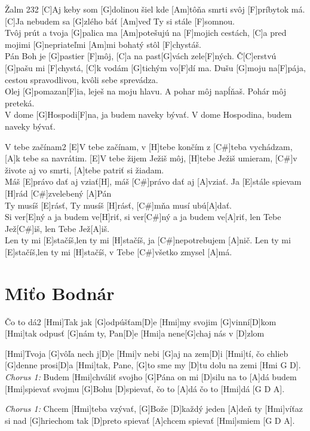 \documentclass[12pt]{article}
\begin{document}
\begin{song}{Žalm 23}{2}
	[C]Aj keby som [G]dolinou šiel 
	kde [Am]tôňa smrti svôj [F]príbytok má.
	[C]Ja nebudem sa [G]zlého báť 
	[Am]veď Ty si stále [F]somnou.
	\\
	[C]Tvôj prút a tvoja [G]palica ma 
	[Am]potešujú na [F]mojich cestách,
	[C]a pred mojimi [G]nepriateľmi 
	[Am]mi bohatý stôl [F]chystáš.
	\\
	[C]Pán Boh je [G]pastier [F]môj,
	[C]a na past[G]vách zele[F]ných.
	Č[C]erstvú [G]pašu mi [F]chystá,
	[C]k vodám [G]tichým vo[F]dí ma.
	\columnbreak
	[C]Dušu [G]moju na[F]pája,
	cestou spravodlivou,
	kvôli sebe sprevádza.
	\\
	[C]Olej [G]pomazan[F]ia,
	leješ na moju hlavu.
	A pohar môj napĺňaš.
	Pohár môj preteká.
	\\
	[C]V dome [G]Hospodi[F]na,
	ja budem naveky bývať.
	V dome Hospodina,
	budem naveky bývať.
\end{song}


\begin{song}{V tebe začínam}{2}
	[E]V tebe začínam, v [H]tebe končím
	z [C#]teba vychádzam, [A]k tebe sa navrátim.
	[E]V tebe žijem Ježiš môj, [H]tebe Ježiš umieram,
	[C#]v živote aj vo smrti, [A]tebe patriť si žiadam.
	\\
	Máš [E]právo dať aj vziať[H],
	máš [C#]právo dať aj [A]vziať.
	Ja [E]stále spievam [H]rád
	[C#]zvelebený [A]Pán
	\\
	Ty musíš [E]rásť, Ty musíš [H]rásť,
	[C#]mňa musí ubú[A]dať.
	\\
	Si ver[E]ný a ja budem ve[H]riť,
	si ver[C#]ný a ja budem ve[A]riť,
	len Tebe Jež[C#]iš, len Tebe Jež[A]iš.
	\\
	Len ty mi [E]stačíš,len ty mi [H]stačíš,
	ja [C#]nepotrebujem [A]nič.
	Len ty mi [E]stačíš,len ty mi [H]stačíš,
	v Tebe [C#]všetko zmysel [A]má.
\end{song}


\newpage

\section{Miťo Bodnár}

\begin{song}{Čo to dá}{2}
	[Hmi]Tak jak [G]odpúšťam[D]e
	[Hmi]my svojim [G]vinní[D]kom
	[Hmi]tak odpusť [G]nám ty, Pan[D]e
	[Hmi]a nene[G]chaj nás v [D]zlom
	
	[Hmi]Tvoja [G]vôľa nech j[D]e
	[Hmi]v nebi [G]aj na zem[D]i
	[Hmi]tí, čo chlieb [G]denne prosi[D]a
	[Hmi]tak, Pane, [G]to sme my
	[D]tu dolu na zemi [Hmi G D].
	\columnbreak
	\textit{\color{gray}Chorus 1:}
	Budem [Hmi]chváliť svojho [G]Pána
	on mi [D]silu na to [A]dá
	budem [Hmi]spievať svojmu [G]Bohu
	[D]spievať, čo to [A]dá
	čo to [Hmi]dá [G D A].
	
	\textit{\color{gray}Chorus 1:}
	Chcem [Hmi]teba vzývať, [G]Bože
	[D]každý jeden [A]deň
	ty [Hmi]víťaz si nad [G]hriechom
	tak [D]preto spievať [A]chcem
	spievať [Hmi]smiem [G D A].
\end{song}
\end{document}
